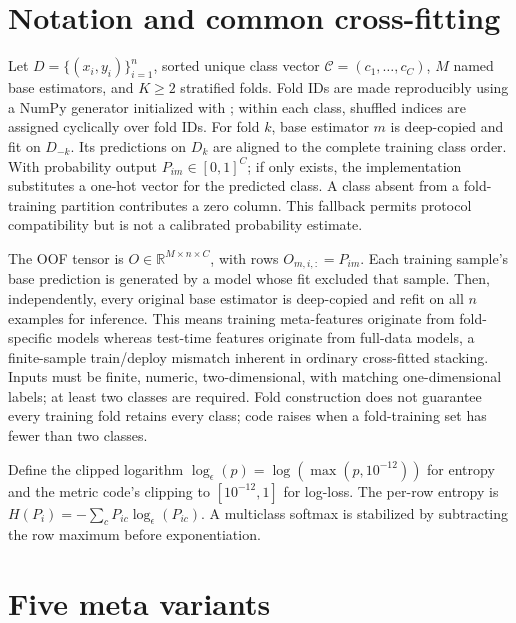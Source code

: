 ﻿\documentclass[conference]{IEEEtran}
\begin{document}
\section{Notation and common cross-fitting}
Let \(D=\{(x_i,y_i)\}_{i=1}^n\), sorted unique class vector \(\mathcal C=(c_1,\ldots,c_C)\), \(M\) named base estimators, and \(K\ge2\) stratified folds. Fold IDs are made reproducibly using a NumPy generator initialized with ; within each class, shuffled indices are assigned cyclically over fold IDs. For fold \(k\), base estimator \(m\) is deep-copied and fit on \(D_{-k}\). Its predictions on \(D_k\) are aligned to the complete training class order. With probability output \(P_{im}\in[0,1]^C\); if only  exists, the implementation substitutes a one-hot vector for the predicted class. A class absent from a fold-training partition contributes a zero column. This fallback permits protocol compatibility but is not a calibrated probability estimate.

The OOF tensor is \(O\in\mathbb R^{M\times n\times C}\), with rows \(O_{m,i,:}=P_{im}\). Each training sample's base prediction is generated by a model whose fit excluded that sample. Then, independently, every original base estimator is deep-copied and refit on all \(n\) examples for inference. This means training meta-features originate from fold-specific models whereas test-time features originate from full-data models, a finite-sample train/deploy mismatch inherent in ordinary cross-fitted stacking. Inputs must be finite, numeric, two-dimensional, with matching one-dimensional labels; at least two classes are required. Fold construction does not guarantee every training fold retains every class; code raises when a fold-training set has fewer than two classes.

Define the clipped logarithm \(\log_\epsilon(p)=\log(\max(p,10^{-12}))\) for entropy and the metric code's clipping to \([10^{-12},1]\) for log-loss. The per-row entropy is \(H(P_i)=-\sum_c P_{ic}\log_\epsilon(P_{ic})\). A multiclass softmax is stabilized by subtracting the row maximum before exponentiation.

\section{Five meta variants}
\end{document}
